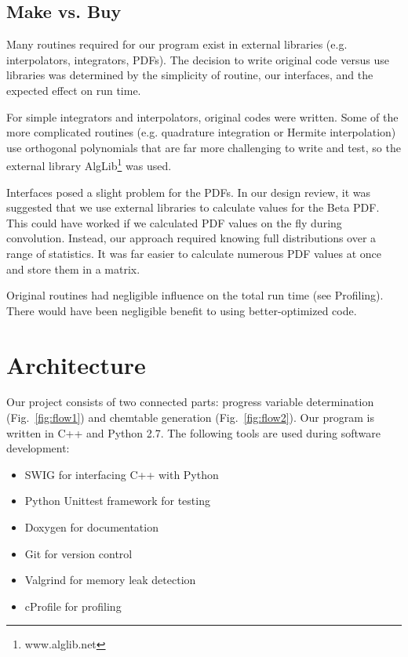 \documentclass[11pt]{article}
\begin{document}



\subsection{Make vs. Buy}
Many routines required for our program exist in external libraries
(e.g. interpolators, integrators, PDFs). The decision to write
original code versus use libraries was determined by the simplicity
of routine, our interfaces, and the expected effect on run time.

For simple integrators and interpolators, original codes were
written. Some of the more complicated routines (e.g. quadrature
integration or Hermite interpolation) use orthogonal polynomials that
are far more challenging to write and test, so the external library
AlgLib\footnote{www.alglib.net} was used.

Interfaces posed a slight problem for the PDFs. In our design review,
it was suggested that we use external libraries to calculate values
for the Beta PDF. This could have worked if we calculated PDF values
on the fly during convolution. Instead, our approach required knowing
full distributions over a range of statistics. It was far easier to
calculate numerous PDF values at once and store them in a matrix.

Original routines had negligible influence on the total
run time (see Profiling). There would have been negligible benefit
to using better-optimized code.
 
\section{Architecture}
Our project consists of two connected parts: progress variable
determination (Fig.~\ref{fig:flow1}) and chemtable generation
(Fig.~\ref{fig:flow2}). Our program is written in C++ and Python 2.7. 
The following tools are used during software development:

\begin{itemize}
\item SWIG for interfacing C++ with Python
\item Python Unittest framework for testing
\item Doxygen for documentation
\item Git for version control
\item Valgrind for memory leak detection
\item cProfile for profiling
\end{itemize}
\end{document}
